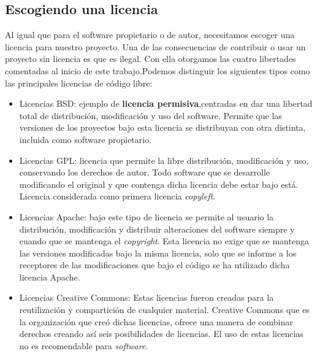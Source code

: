 \subsection*{Escogiendo una licencia}
Al igual que para el software propietario o de autor, necesitamos escoger una licencia para nuestro proyecto. Una de las consecuencias de contribuir o usar un proyecto sin licencia es que es ilegal. Con ella otorgamos las cuatro libertades comentadas al inicio de este trabajo.Podemos distinguir los siguientes tipos como las principales licencias de código libre:
\begin{itemize}
    \item Licencias BSD: ejemplo de \textbf{licencia permisiva},centradas en dar una libertad total de distribución, modificación y uso del software. Permite que las versiones de los proyectos bajo esta licencia se distribuyan con otra distinta, incluida como software propietario.
    \item Licencias GPL: licencia que permite la libre distribución, modificación y uso, conservando los derechos de autor. Todo software que se desarrolle modificando el original y que contenga dicha licencia debe estar bajo está. Licencia considerada como primera licencia \textit{copyleft}.
    \item Licencias Apache: bajo este tipo de licencia se permite al usuario la distribución, modificación y distribuir alteraciones del software siempre y cuando que se mantenga el \emph{copyright}. Esta licencia no exige que se mantenga las versiones modificadas bajo la misma licencia, solo que se informe a los receptores de las modificaciones que bajo el código se ha utilizado dicha licencia Apache.
    \item Licencias Creative Commons: Estas licencias fueron creadas para la reutilización y compartición de cualquier material. Creative Commons que es la organización que creó dichas licencias, ofrece una manera de combinar derechos creando así seis posibilidades de licencias. El uso de estas licencias no es recomendable para \emph{software}.
    \begin{figure}[H]
        \centering

\end{figure}
\end{itemize}
